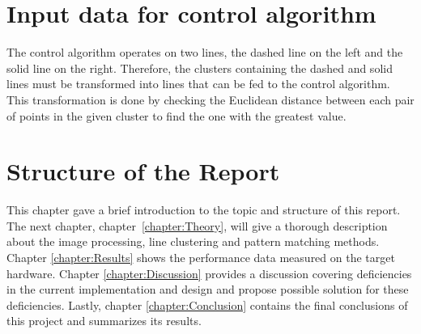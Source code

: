 \documentclass[Report.tex]{subfiles}
\begin{document}
\section{Input data for control algorithm} %
The control algorithm operates on two lines, the dashed line on the left and
the solid line on the right. Therefore, the clusters containing the dashed and
solid lines must be transformed into lines that can be fed to the control
algorithm. This transformation is done by checking the Euclidean distance
between each pair of points in the given cluster to find the one with the
greatest value.

\section{Structure of the Report} %
This chapter gave a brief introduction to the topic and structure of this
report. The next chapter, chapter~\ref{chapter:Theory}, will give a thorough
description about the image processing, line clustering and pattern matching
methods. Chapter \ref{chapter:Results} shows the performance data measured on
the target hardware. Chapter \ref{chapter:Discussion} provides a discussion
covering deficiencies in the current implementation and design and propose
possible solution for these deficiencies. Lastly, chapter
\ref{chapter:Conclusion} contains the final conclusions of this project and
summarizes its results.
\end{document}
